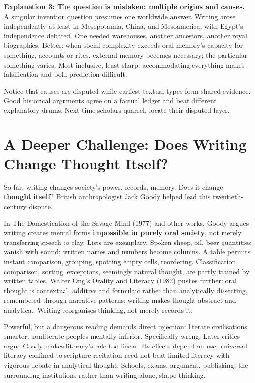 \textbf{Explanation 3: The question is mistaken: multiple origins and causes.} A singular invention question presumes one worldwide answer. Writing arose independently at least in Mesopotamia, China, and Mesoamerica, with Egypt's independence debated. One needed warehouses, another ancestors, another royal biographies. Better: when social complexity exceeds oral memory's capacity for something, accounts or rites, external memory becomes necessary; the particular something varies. Most inclusive, least sharp: accommodating everything makes falsification and bold prediction difficult.

Notice that causes are disputed while earliest textual types form shared evidence. Good historical arguments agree on a factual ledger and beat different explanatory drums. Next time scholars quarrel, locate their disputed layer.

\section[Further Challenge: Writing and Thought]{A Deeper Challenge: Does Writing Change Thought Itself?}
So far, writing changes society's power, records, memory. Does it change \textbf{thought itself}? British anthropologist Jack Goody helped lead this twentieth-century dispute.

In The Domestication of the Savage Mind (1977) and other works, Goody argues writing creates mental forms \textbf{impossible in purely oral society}, not merely transferring speech to clay. Lists are exemplary. Spoken sheep, oil, beer quantities vanish with sound; written names and numbers become columns. A table permits instant comparison, grouping, spotting empty cells, reordering. Classification, comparison, sorting, exceptions, seemingly natural thought, are partly trained by written tables. Walter Ong's Orality and Literacy (1982) pushes further: oral thought is contextual, additive and formulaic rather than analytically dissecting, remembered through narrative patterns; writing makes thought abstract and analytical. Writing reorganises thinking, not merely records it.

Powerful, but a dangerous reading demands direct rejection: literate civilisations smarter, nonliterate peoples mentally inferior. Specifically wrong. Later critics argue Goody makes literacy's role too linear. Its effects depend on use: universal literacy confined to scripture recitation need not beat limited literacy with vigorous debate in analytical thought. Schools, exams, argument, publishing, the surrounding institutions rather than writing alone, shape thinking.

